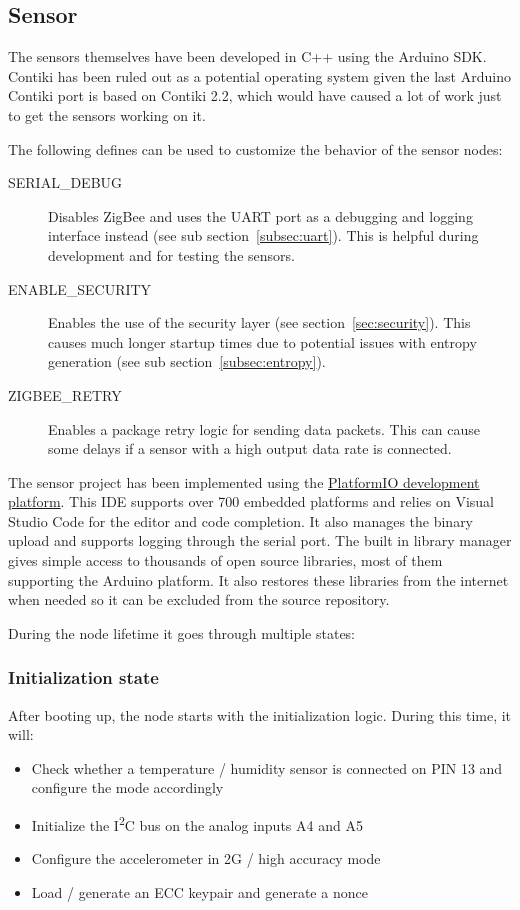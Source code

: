 \documentclass[a4paper,11pt]{scrartcl}
\begin{document}
\subsection{Sensor}
The sensors themselves have been developed in C++ using the Arduino SDK. Contiki has been ruled out as a potential operating system given the last Arduino Contiki port is based on Contiki 2.2, which would have caused a lot of work just to get the sensors working on it.

The following defines can be used to customize the behavior of the sensor nodes:

\begin{description}
\item[SERIAL\_DEBUG] Disables ZigBee and uses the UART port as a debugging and logging interface instead (see sub section~\ref{subsec:uart}). This is helpful during development and for testing the sensors.
\item[ENABLE\_SECURITY] Enables the use of the security layer (see section~\ref{sec:security}). This causes much longer startup times due to potential issues with entropy generation (see sub section~\ref{subsec:entropy}).
\item[ZIGBEE\_RETRY] Enables a package retry logic for sending data packets. This can cause some delays if a sensor with a high output data rate is connected.
\end{description}

The sensor project has been implemented using the \href{https://platformio.org/}{PlatformIO development platform}. This IDE supports over 700 embedded platforms and relies on Visual Studio Code for the editor and code completion. It also manages the binary upload and supports logging through the serial port. The built in library manager gives simple access to thousands of open source libraries, most of them supporting the Arduino platform. It also restores these libraries from the internet when needed so it can be excluded from the source repository.

During the node lifetime it goes through multiple states:

\subsubsection*{Initialization state}
After booting up, the node starts with the initialization logic. During this time, it will:

\begin{itemize}
\item Check whether a temperature / humidity sensor is connected on PIN 13 and configure the mode accordingly
\item Initialize the I\textsuperscript{2}C bus on the analog inputs A4 and A5
\item Configure the accelerometer in 2G / high accuracy mode
\item Load / generate an ECC keypair and generate a nonce
\end{itemize}
\end{document}

